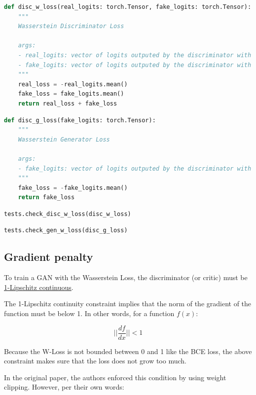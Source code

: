 \begin{lstlisting}[language=Python]
def disc_w_loss(real_logits: torch.Tensor, fake_logits: torch.Tensor):
    """
    Wasserstein Discriminator Loss
    
    args:
    - real_logits: vector of logits outputed by the discriminator with a real input image
    - fake_logits: vector of logits outputed by the discriminator with a fake input image 
    """
    real_loss = -real_logits.mean()
    fake_loss = fake_logits.mean()
    return real_loss + fake_loss
\end{lstlisting}

\begin{lstlisting}[language=Python]
def disc_g_loss(fake_logits: torch.Tensor):
    """
    Wasserstein Generator Loss
    
    args:
    - fake_logits: vector of logits outputed by the discriminator with a fake input image 
    """
    fake_loss = -fake_logits.mean()
    return fake_loss
\end{lstlisting}

\begin{lstlisting}[language=Python]
tests.check_disc_w_loss(disc_w_loss)
\end{lstlisting}

\begin{lstlisting}[language=Python]
tests.check_gen_w_loss(disc_g_loss)
\end{lstlisting}

\subsection{Gradient penalty}

To train a GAN with the Wasserstein Loss, the discriminator (or critic)
must be
\href{https://en.wikipedia.org/wiki/Lipschitz_continuity}{1-Lipschitz
continuous}. \newline

The 1-Lipschitz continuity constraint implies that the norm of the
gradient of the function must be below 1. In other words, for a function
\(f(x)\):

\[|| \frac{df}{dx} || < 1\]

Because the W-Loss is not bounded between 0 and 1 like the BCE loss, the
above constraint makes sure that the loss does not grow too much. \newline

In the original paper, the authors enforced this condition by using
weight clipping. However, per their own words:

